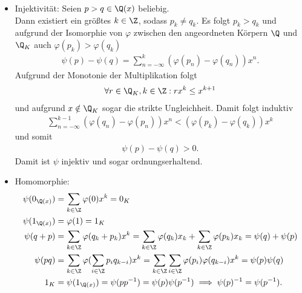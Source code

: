 \begin{solution}
\begin{itemize}
  \item Injektivität: Seien $p > q \in \Q(x)$ beliebig. \\
  Dann existiert ein größtes $k \in \Z$, sodass $p_k \neq q_k$. Es folgt $p_k > q_k$ und
  aufgrund der Isomorphie von $\varphi$ zwischen den angeordneten Körpern $\Q$ und $\Q_K$
  auch $\varphi(p_k) > \varphi(q_k)$
  \begin{align*}
    \psi(p) - \psi(q) = \sum_{n = -\infty}^k(\varphi(p_n) - \varphi(q_n))x^n.
  \end{align*}
  Aufgrund der Monotonie der Multiplikation folgt
  \begin{align*}
    \forall r \in \Q_K, k \in \Z: rx^k \leq x^{k+1}
  \end{align*}
  und aufgrund $x \notin \Q_K$ sogar die strikte Ungleichheit.
  Damit folgt induktiv
  \begin{align*}
    \sum_{n = -\infty}^{k - 1} (\varphi(q_n) - \varphi(p_n))x^n < (\varphi(p_k) - \varphi(q_k))x^k
  \end{align*}
  und somit
  \begin{align*}
    \psi(p) - \psi(q) > 0.
  \end{align*}
  Damit ist $\psi$ injektiv und sogar ordnungserhaltend.
  \item Homomorphie:
  \begin{align*}
    \psi(0_{\Q(x)}) &= \sum_{k \in \Z}\varphi(0)x^k = 0_K \\
    \psi(1_{\Q(x)}) &= \varphi(1) = 1_K \\
    \psi(q + p) &= \sum_{k \in \Z}\varphi(q_k + p_k)x^k =
    \sum_{k \in \Z}\varphi(q_k)x_k + \sum_{k \in \Z}\varphi(p_k)x_k
    = \psi(q) + \psi(p) \\
    \psi(pq) &= \sum_{k \in \Z}\varphi(\sum_{i \in \Z}p_iq_{k-i})x^k =
    \sum_{k \in \Z}\sum_{i \in \Z}\varphi(p_i)\varphi(q_{k-i})x^k
    = \psi(p)\psi(q) \\
    1_K &= \psi(1_{\Q(x)}) = \psi(pp^{-1}) = \psi(p)\psi(p^{-1})
    \implies \psi(p)^{-1} = \psi(p^{-1}).
  \end{align*}
\end{itemize}
\end{solution}
